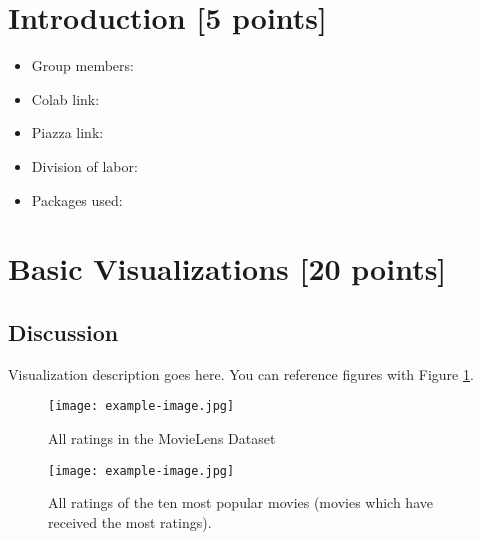 \newif\ifshowsolutions
\showsolutionstrue







\pagestyle{fancy}




\newpage

\section{Introduction [5 points]}
\begin{itemize}
    \item Group members:
    \item Colab link:
    \item Piazza link:
    \item Division of labor:
    \item Packages used:
\end{itemize}

\newpage

\section{Basic Visualizations [20 points]}

\subsection{Discussion}

Visualization description goes here. You can reference figures with Figure \ref{fig:basic_vis_1}.

\begin{figure}[h]
    \centering
    \texttt{[image: example-image.jpg]}
    \caption{All ratings in the MovieLens Dataset}
    \label{fig:basic_vis_1}
\end{figure}

\begin{figure}[!h]
    \centering
    \texttt{[image: example-image.jpg]}
    \caption{All ratings of the ten most popular movies (movies which have received the most ratings).}
    \label{fig:basic_vis_2}
\end{figure}

